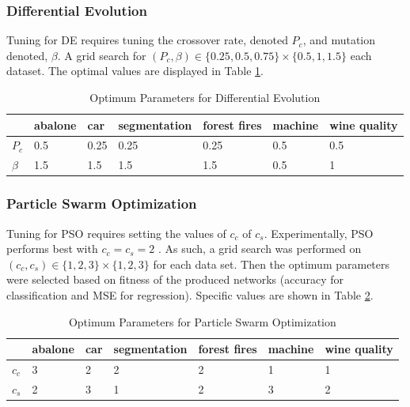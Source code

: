 \documentclass[twoside,11pt]{article}
\begin{document}
\subsubsection{Differential Evolution}

	Tuning for DE requires tuning the crossover rate, denoted $P_c$, and mutation denoted, $\beta$. A grid search for
	$(P_c, \beta) \in \{ 0.25, 0.5, 0.75 \} \times \{ 0.5, 1, 1.5 \}$
	each dataset.
	The optimal values are displayed in Table \ref{de-tuning-table}.
	\begin{table}[h]
		\centering
		\begin{tabular}{|l|l|l|l|l|l|l|}
			\hline
			       & abalone & car & segmentation & forest fires & machine & wine quality  \\ \hline
			$P_c$  &     0.5 & 0.25&         0.25 &         0.25 &     0.5 &          0.5  \\ \hline
			$\beta$&     1.5 & 1.5 &          1.5 &          1.5 &     0.5 &            1  \\ \hline
		\end{tabular}
		\caption{Optimum Parameters for Differential Evolution}
		\label{de-tuning-table}
	\end{table}

\subsubsection{Particle Swarm Optimization}

	Tuning for PSO requires setting the values of $c_c$ of $c_s$.
	Experimentally, PSO performs best with $c_c = c_s = 2$ \citep{empirical-pso}.
	As such, a grid search was performed on $ (c_c, c_s) \in \{ 1, 2, 3 \} \times \{ 1, 2, 3 \} $ for each data set.
	Then the optimum parameters were selected based on fitness of the produced networks (accuracy for classification and MSE for regression).
	Specific values are shown in Table \ref{pso-tuning-table}.
	\begin{table}[h]
		\centering
		\begin{tabular}{|l|l|l|l|l|l|l|}
			\hline
			       & abalone & car & segmentation & forest fires & machine & wine quality  \\ \hline
			$c_c$  &       3 &   2 &            2 &            2 &       1 &            1  \\ \hline
			$c_s$  &       2 &   3 &            1 &            2 &       3 &            2  \\ \hline
		\end{tabular}
		\caption{Optimum Parameters for Particle Swarm Optimization}
		\label{pso-tuning-table}
	\end{table}
\end{document}

